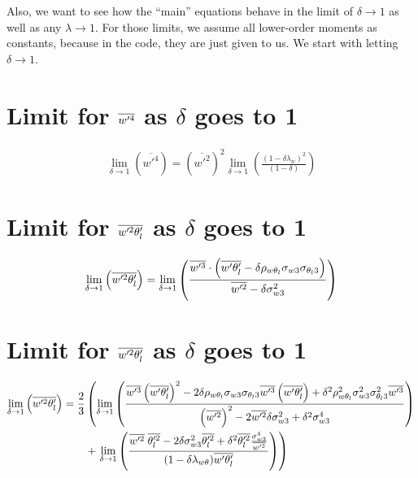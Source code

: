 Also, we want to see how the \enquote{main} equations behave in the limit of $\delta \to 1$ as well as any $\lambda \to 1$.
For those limits, we assume all lower-order moments as constants, because in the code, they are just given to us.
We start with letting $\delta \to 1$.


\section{Limit for \texorpdfstring{$\overline{w'^4}$}{wprime4bar} as \texorpdfstring{$\delta$}{delta} goes to 1}
\label{sec:limit-for-wprime4bar-as-delta-goes-to-1}

\begin{align}
    \label{eq:limit_wprime4_delta_to_1}
    \lim_{\delta \to 1}\left(\overline{w'^4}\right)
    = \left(\overline{w'^2}\right)^2
    \lim_{\delta \to 1}
    \left(\frac{
        \left(1-\delta\lambda_w\right)^2
    }{(1-\delta)}
    \right)
\end{align}


\section{Limit for \texorpdfstring{$\overline{w'^2 \theta_l'}$}{wprime2thetalbar} as \texorpdfstring{$\delta$}{delta} goes to 1}
\label{sec:limit-for-wprime2thetalbar-as-delta-goes-to-1}

\begin{align}
    \label{eq:limit_wprime2thetalbar_delta_to_1}
    \lim_{\delta \to 1}\left(\overline{w'^2 \theta_l'}\right)
    = \lim_{\delta \to 1}\left(
    \frac{\overline{w'^3} \cdot \left(\overline{w'\theta_l'} - \delta \rho_{w \theta_l} \sigma_{w 3} \sigma_{\theta_l 3}\right)}
    {\overline{w'^2} - \delta \sigma_{w 3}^2}
    \right)
\end{align}


\section{Limit for \texorpdfstring{$\overline{w'^2 \theta_l'}$}{wprimethetaltwobar} as \texorpdfstring{$\delta$}{delta} goes to 1}
\label{sec:limit-for-wprimethetal2bar-as-delta-goes-to-1}

\begin{align}
    \label{eq:limit_wprimethetalprime2bar_delta_to_1}
    \lim_{\delta \to 1}\left(\overline{w'^2 \theta_l'}\right)
    = \frac{2}{3}
    &\left(
    \lim_{\delta \to 1}
    \left(
    \frac{
        \overline{w'^3} \left(\overline{w' \theta_l'} \right)^2 - 2\delta\rho_{w \theta_l} \sigma_{w 3} \sigma_{\theta_l 3} \overline{w'^3} \left(\overline{w' \theta_l'} \right) +
        \delta^2 \rho_{w \theta_l}^2 \sigma_{w 3}^2 \sigma_{\theta_l 3}^2\overline{w'^3}
    }
    {
        \left(\overline{w'^2}\right)^2 - 2\overline{w'^2}\delta\sigma_{w 3}^2 + \delta^2\sigma_{w 3}^4
    }
    \right)
    \right.
    \nonumber\\ &+
    \left.
    \lim_{\delta \to 1}
    \left(
    \frac{
        \overline{w'^2} \; \overline{\theta_l'^2} - 2\delta\sigma_{w 3}^2 \overline{\theta_l'^2} + \delta^2 \overline{\theta_l'^2} \frac{\sigma_{w 3}^4}{\overline{w'^2}}
    }
    {
        (1-\delta \lambda_{w \theta}) \overline{w' \theta_l'}
    }
    \right)
    \right)
\end{align}